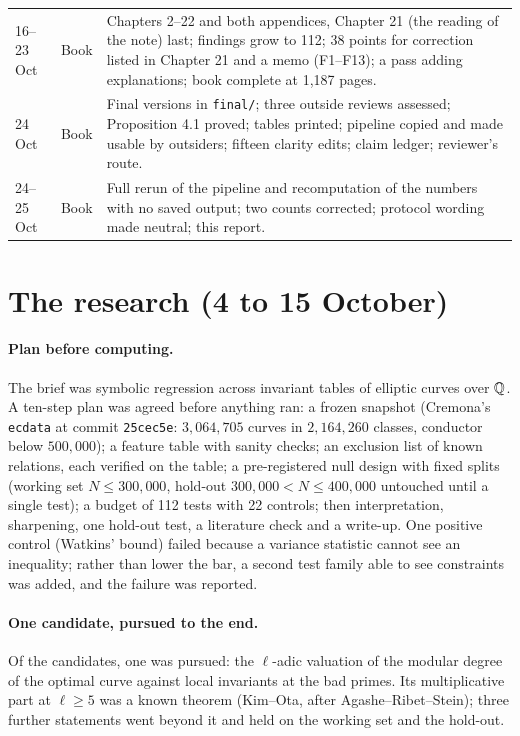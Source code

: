 \documentclass[11pt,a4paper]{article}
\begin{document}
\begin{center}
\begin{longtable}{@{}p{15mm}p{24mm}p{110mm}@{}}
16--23 Oct & Book & Chapters 2--22 and both appendices, Chapter 21 (the reading of the note) last; findings grow to 112; 38 points for correction listed in Chapter 21 and a memo (F1--F13); a pass adding explanations; book complete at 1,187 pages.\\
24 Oct & Book & Final versions in \texttt{final/}; three outside reviews assessed; Proposition 4.1 proved; tables printed; pipeline copied and made usable by outsiders; fifteen clarity edits; claim ledger; reviewer's route.\\
24--25 Oct & Book & Full rerun of the pipeline and recomputation of the numbers with no saved output; two counts corrected; protocol wording made neutral; this report.\\
\bottomrule
\end{longtable}
\end{center}

\section{The research (4 to 15 October)}
\paragraph{Plan before computing.} The brief was symbolic regression across invariant tables of elliptic curves over $\mathbb Q$. A ten-step plan was agreed before anything ran: a frozen snapshot (Cremona's \texttt{ecdata} at commit \texttt{25cec5e}: $3{,}064{,}705$ curves in $2{,}164{,}260$ classes, conductor below $500{,}000$); a feature table with sanity checks; an exclusion list of known relations, each verified on the table; a pre-registered null design with fixed splits (working set $N\le300{,}000$, hold-out $300{,}000<N\le400{,}000$ untouched until a single test); a budget of 112 tests with 22 controls; then interpretation, sharpening, one hold-out test, a literature check and a write-up. One positive control (Watkins' bound) failed because a variance statistic cannot see an inequality; rather than lower the bar, a second test family able to see constraints was added, and the failure was reported.

\paragraph{One candidate, pursued to the end.} Of the candidates, one was pursued: the $\ell$-adic valuation of the modular degree of the optimal curve against local invariants at the bad primes. Its multiplicative part at $\ell\ge5$ was a known theorem (Kim--Ota, after Agashe--Ribet--Stein); three further statements went beyond it and held on the working set and the hold-out.
\end{document}
